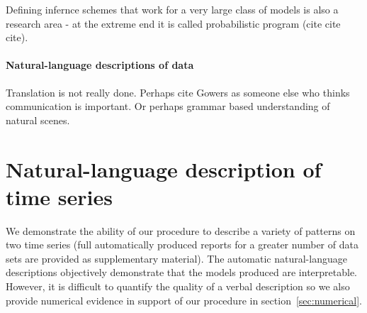 \documentclass{article}
\begin{document}
Defining infernce schemes that work for a very large class of models is also a research area - at the extreme end it is called probabilistic program (cite cite cite).

\paragraph{Natural-language descriptions of data}

Translation is not really done.
Perhaps cite Gowers as someone else who thinks communication is important.
Or perhaps grammar based understanding of natural scenes.

\section{Natural-language description of time series}
\label{sec:examples}

We demonstrate the ability of our procedure to describe a variety of patterns on two time series (full automatically produced reports for a greater number of data sets are provided as supplementary material).
The automatic natural-language descriptions objectively demonstrate that the models produced are interpretable.
However, it is difficult to quantify the quality of a verbal description so we also provide numerical evidence in support of our procedure in section~\ref{sec:numerical}.
\end{document}
